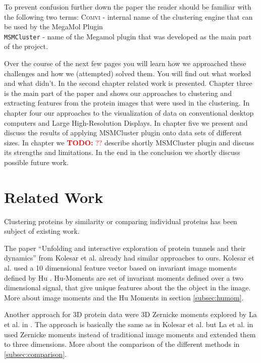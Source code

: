 \documentclass[journal]{vgtc}       %
\newcommand{\todo}[1]{\textcolor{red}{\textbf{TODO:} #1}}
\begin{document}
To prevent confusion further down the paper  the reader should be familiar with the following two terms: \textsc{Comvi} - internal name of the clustering engine that can be used by the MegaMol Plugin \\
\verb|MSMCluster| - name of the Megamol plugin that was developed as the main part of the project.

Over the course of the next few pages you will learn how we approached these challenges and how we (attempted) solved them. You will find out what  worked and what didn't. In the second chapter related work is presented. Chapter three is the main part of the paper and shows our approaches to clustering and extracting features from the protein images that were used in the clustering. In chapter four our approaches to the visualization of data on conventional desktop computers and Large High-Resolution Displays. In chapter five we present and discuss the results of applying MSMCluster plugin onto data sets of different sizes. In chapter we \todo{??} describe shortly MSMCluster plugin and discuss its strengths and limitations. In the end in the conclusion we shortly discuss possible future work.


\section{Related Work}\label{sec:relatedWork}

Clustering proteins by similarity or comparing individual proteins has been subject of existing work.

The paper ``Unfolding and interactive exploration of protein tunnels and their dynamics'' \cite{kolesar} from Kolesar et al.  already had similar approaches to ours. Kolesar et al. used a 10 dimensional feature vector based on invariant image moments defined by Hu \cite{humoments}. Hu-Moments are set of invariant moments defined over a two dimensional signal, that give unique features about the the object in the image. More about image moments and the Hu Moments in section \ref{subsec:humom}.


Another approach for 3D protein data were 3D Zernicke moments explored by La et al. in \cite{3dsurfer}. The approach is basically the same as in Kolesar et al. but La et al.  in \cite{3dsurfer} used Zernicke moments instead of traditional image moments and extended them to three dimensions. More about the comparison of the different methods in \ref{subsec:comparison}.
\end{document}
